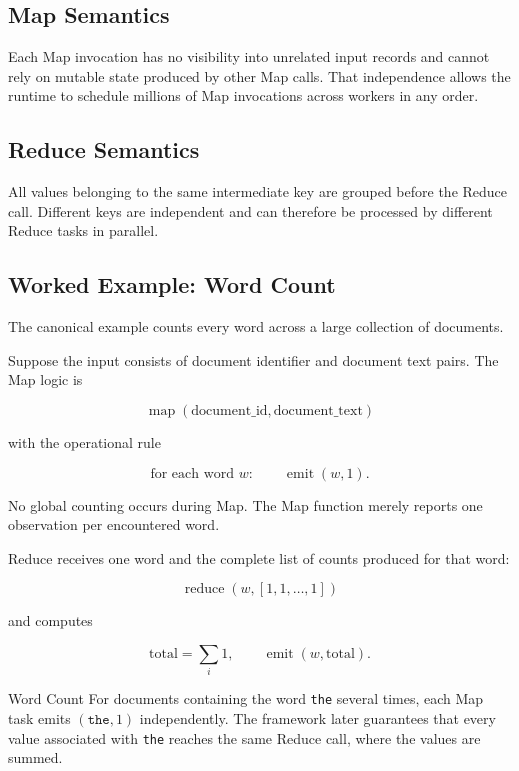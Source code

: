 \documentclass[11pt,a4paper,oneside]{book}
\begin{document}
\subsection{Map Semantics}

Each Map invocation has no visibility into unrelated input records and cannot rely on mutable state produced by other Map calls. That independence allows the runtime to schedule millions of Map invocations across workers in any order.

\subsection{Reduce Semantics}

All values belonging to the same intermediate key are grouped before the Reduce call. Different keys are independent and can therefore be processed by different Reduce tasks in parallel.

\subsection{Worked Example: Word Count}

The canonical example counts every word across a large collection of documents.

Suppose the input consists of document identifier and document text pairs. The Map logic is

\[
\operatorname{map}(\text{document\_id},\text{document\_text})
\]

with the operational rule

\[
\text{for each word }w:
\qquad
\operatorname{emit}(w,1).
\]

No global counting occurs during Map. The Map function merely reports one observation per encountered word.

Reduce receives one word and the complete list of counts produced for that word:

\[
\operatorname{reduce}(w,[1,1,\ldots,1])
\]

and computes

\[
\text{total}=\sum_i 1,
\qquad
\operatorname{emit}(w,\text{total}).
\]

\begin{examplebox}{Word Count}
For documents containing the word \texttt{the} several times, each Map task emits \((\texttt{the},1)\) independently. The framework later guarantees that every value associated with \texttt{the} reaches the same Reduce call, where the values are summed.
\end{examplebox}
\end{document}
